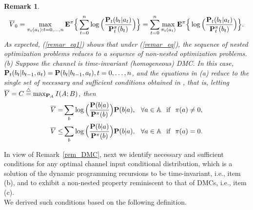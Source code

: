 \documentclass[11pt, a4paper, journal,onecolumn]{IEEEtran}
\newcommand{\mb}{\mathbb}
\newcommand{\sr}{\stackrel}
\newcommand{\tri}{\sr{\triangle}{=}}
\newcommand{\hso}{\hspace{.1in}}
\newtheorem{remark}{Remark}[section]
\begin{document}
\begin{remark}
\begin{align}
\overline{V}_0= \max_{\pi_t(a_t): t=0, \ldots, n} {\bf E}^\pi \Big\{ \sum_{t=0}^n 
\log\Big(\frac{{\bf P}_t(b_t|a_t)}{{\bf P}_t^{\pi}(b_t)}\Big)\Big\}
= \sum_{t=0}^n \max_{\pi_t(a_t)}{\bf E}^\pi \Big\{ \log\Big(\frac{{\bf P}_t(b_t|a_t)}{{\bf P}_t^{\pi}(b_t)}\Big)\Big\}. \label{remar_eq1}
\end{align}
As expected, (\ref{remar_eq1}) shows that under (\ref{remar_eq}), the sequence of nested optimization problems reduces to a sequence of non-nested optimization problems.\\
(b) Suppose the channel is time-invariant (homogeneous) DMC. In this case, $
{\bf P}_t(b_t|b_{t-1}, a_t)={\bf P}(b_t|b_{t-1}, a_t), t=0, \ldots, n$, and the equations in (a) reduce to the  single set of necessary and sufficient conditions obtained in \cite{gallager}, that is,  letting $\overline{V}= C \tri \max_{{\bf P}_A}I(A; B)$, then 
\begin{align}
\overline{V} =& \sum_{b}\log\Big(\frac{{\bf P}(b|a)}{{\bf P}^{\pi}(b)}\Big){\bf P}(b|a), \hso   \forall{a}\in{\mb A} \hso \mbox{if} \hso \pi(a)\neq{0},  \label{suff_equa_ter_con_cc}\\
\overline{V} \leq & \sum_{b}\log\Big(\frac{{\bf P}(b|a)}{{\bf P}^{\pi}(b)}\Big){\bf P}(b|a), \hso   \forall{a}\in{\mb A} \hso \mbox{if} \hso \pi(a)={0}.  \label{suff_equa_ter_con_dd}
\end{align}
\end{remark}

In view of Remark~\ref{rem_DMC},
next we identify necessary and  sufficient conditions for any optimal channel input conditional distribution, which is a solution of the dynamic programming recursions to be time-invariant, i.e., item (b), and to exhibit a non-nested property reminiscent to that of DMCs, i.e., item (c). \\

We derived such conditions based on the following definition. \\ 
\end{document}
